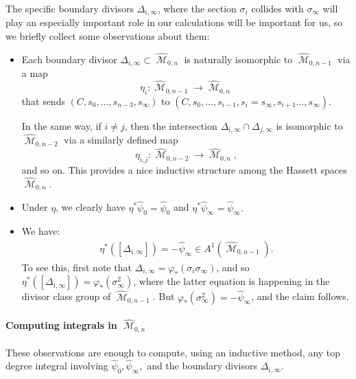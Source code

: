 \documentclass[12pt,reqno]{amsart}
\DeclareMathOperator{\M}{\mathcal{M}}
\renewcommand{\to}{{\longrightarrow}}
\numberwithin{equation}{section}
\newcommand{\hpsi}{\widehat{\psi}}
\newcommand{\hM}{\widehat{\M}}
\begin{document}
The specific boundary divisors $\Delta_{i, \infty}$, where the section
$\sigma_{i}$ collides with $\sigma_{\infty}$ will play an especially
important role in our calculations will be important for us, so we
briefly collect some observations about them:
\begin{itemize}\label{item:boundaryprops}
\item Each boundary divisor $\Delta_{i,\infty} \subset \hM_{0,n}$ is
  naturally isomorphic to $\hM_{0,n-1}$ via a map
  $$\eta_{i}: \hM_{0,n-1} \to \hM_{0,n}$$ that sends
  $(C, s_{0}, \dots, s_{n-3}, s_{\infty})$ to
  $(C, s_{0}, \dots, s_{i-1}, s_{i}=s_{\infty}, s_{i+1} \dots,
  s_{\infty})$.

  In the same way, if $i \neq j$, then the intersection
  $\Delta_{i,\infty} \cap \Delta_{j, \infty}$ is isomorphic to
  $\hM_{0,n-2}$ via a similarly defined map
  $$\eta_{i,j}: \hM_{0,n-2} \to \hM_{0,n},$$ and so on.  This provides a
  nice inductive structure among the Hassett spaces $\hM_{0,n}$.
  
\item Under $\eta$, we clearly have $\eta^{*}\hpsi_{0} = \hpsi_{0}$
  and $\eta^{*}\hpsi_{\infty} = \hpsi_{\infty}.$
\item We have:
\begin{align}\label{eq:pullbackdelta}
  \eta^{*}([\Delta_{i,\infty}]) = -\hpsi_{\infty} \in A^{1}(\hM_{0,n-1}).
\end{align}
To see this, first note that
$\Delta_{i, \infty} = \varphi_{*}(\sigma_{i}\sigma_{\infty})$, and so
$\eta^{*}([\Delta_{i,\infty}]) = \varphi_{*}(\sigma_{\infty}^{2})$,
where the latter equation is happening in the divisor class group of
$\hM_{0,n-1}$.  But
$\varphi_{*}(\sigma_{\infty}^{2}) = - \hpsi_{\infty}$, and the claim
follows.
\end{itemize}


\paragraph{Computing integrals in $\hM_{0,n}$}

These observations are enough to compute, using an inductive method,
any top degree integral involving $\hpsi_{0}, \hpsi_{\infty},$ and the
boundary divisors $\Delta_{i, \infty}$.
\end{document}
